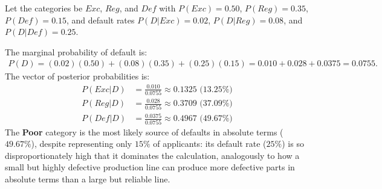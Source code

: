 \begin{solproblema}[prob:3bf9f42]
	Let the categories be $Exc$, $Reg$, and $Def$ with $P(Exc)=0.50$, $P(Reg)=0.35$, $P(Def)=0.15$, and default rates $P(D|Exc)=0.02$, $P(D|Reg)=0.08$, and $P(D|Def)=0.25$.

	The marginal probability of default is:
	\begin{align}
		P(D) = (0.02)(0.50)+(0.08)(0.35)+(0.25)(0.15) = 0.010+0.028+0.0375 = 0.0755.
	\end{align}
	The vector of posterior probabilities is:
	\begin{align}
		P(Exc|D) &= \frac{0.010}{0.0755} \approx 0.1325 \text{ (13.25\%)} \\
		P(Reg|D) &= \frac{0.028}{0.0755} \approx 0.3709 \text{ (37.09\%)} \\
		P(Def|D) &= \frac{0.0375}{0.0755} \approx 0.4967 \text{ (49.67\%)}
	\end{align}
	The \textbf{Poor} category is the most likely source of defaults in absolute terms ($49.67\%$), despite representing only $15\%$ of applicants: its default rate ($25\%$) is so disproportionately high that it dominates the calculation, analogously to how a small but highly defective production line can produce more defective parts in absolute terms than a large but reliable line.
\end{solproblema}

